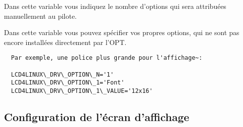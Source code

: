 \begin{description}
  Dans cette variable vous indiquez le nombre d'options qui sera attribuées manuellement au pilote.


  Dans cette variable vous pouvez spécifier vos propres options, qui ne sont pas encore
  installées directement par l'OPT.

\begin{example}
\begin{verbatim}
  Par exemple, une police plus grande pour l'affichage~:

  LCD4LINUX\_DRV\_OPTION\_N='1'
  LCD4LINUX\_DRV\_OPTION\_1='Font'
  LCD4LINUX\_DRV\_OPTION\_1\_VALUE='12x16'

\end{verbatim}
\end{example}

\end{description}

\subsection{Configuration de l'écran d'affichage}

